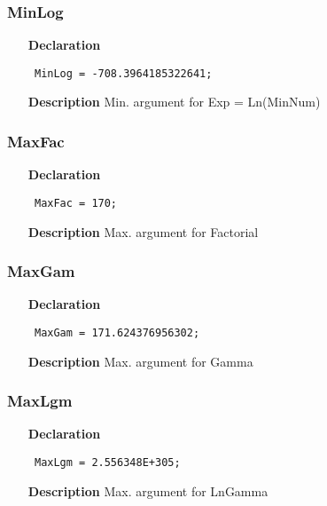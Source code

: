 \documentclass[12pt,a4paper,oneside]{report}
\newcommand{\declarationitem}[1]{\textbf{#1}}
\newcommand{\descriptiontitle}[1]{\textbf{#1}}
\newcommand{\code}[1]{\texttt{#1}}
\begin{document}
\subsubsection{MinLog}
\label{utypes-}
\begin{itemize}\item[\declarationitem{Declaration}\hfill]
	\begin{flushleft}
		\code{
			MinLog   = -708.3964185322641;}
	\end{flushleft}
\item[\descriptiontitle{Description}]
Min. argument for Exp = Ln(MinNum)	
\end{itemize}
\subsubsection{MaxFac}
\label{utypes-MaxFac}
\begin{itemize}\item[\declarationitem{Declaration}\hfill]
	\begin{flushleft}
		\code{
			MaxFac   = 170;}
		
	\end{flushleft}
\item[\descriptiontitle{Description}]
Max. argument for Factorial	
\end{itemize}
\subsubsection{MaxGam}
\label{utypes-MaxGam}
\begin{itemize}\item[\declarationitem{Declaration}\hfill]
	\begin{flushleft}
		\code{
			MaxGam   = 171.624376956302;}
	\end{flushleft}
\item[\descriptiontitle{Description}]
Max. argument for Gamma	
\end{itemize}
\subsubsection{MaxLgm}
\label{utypes-MaxLgm}
\begin{itemize}\item[\declarationitem{Declaration}\hfill]
	\begin{flushleft}
		\code{
			MaxLgm   = 2.556348E+305;}
	\end{flushleft}
\item[\descriptiontitle{Description}]
Max. argument for LnGamma	
\end{itemize}
\end{document}
